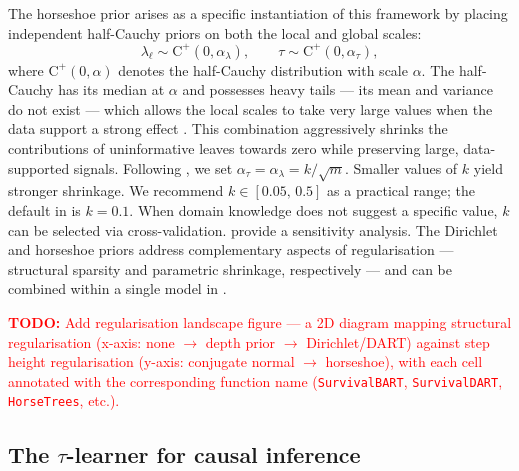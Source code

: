 The horseshoe prior \citep{carvalho2010horseshoe} arises as a specific instantiation of this framework by placing independent half-Cauchy priors on both the local and global scales:
\[
\lambda_\ell \sim \text{C}^+(0, \alpha_\lambda), \qquad
\tau \sim \text{C}^+(0, \alpha_\tau),
\]
where \(\text{C}^+(0, \alpha)\) denotes the half-Cauchy distribution with scale \(\alpha\). The half-Cauchy has its median at \(\alpha\) and possesses heavy tails --- its mean and variance do not exist --- which allows the local scales to take very large values when the data support a strong effect \citep{polson2012halfcauchy}. This combination aggressively shrinks the contributions of uninformative leaves towards zero while preserving large, data-supported signals. Following \citet{jacobs2025horseshoe}, we set \(\alpha_\tau = \alpha_\lambda = k / \sqrt{m}\). Smaller values of \(k\) yield stronger shrinkage. We recommend \(k \in [0.05,\, 0.5]\) as a practical range; the default in  is \(k = 0.1\). When domain knowledge does not suggest a specific value, \(k\) can be selected via cross-validation. \citet{jacobs2025horseshoe} provide a sensitivity analysis. The Dirichlet and horseshoe priors address complementary aspects of regularisation --- structural sparsity and parametric shrinkage, respectively --- and can be combined within a single model in .

\textcolor{red}{\textbf{TODO:} Add regularisation landscape figure — a 2D diagram mapping structural regularisation (x-axis: none $\to$ depth prior $\to$ Dirichlet/DART) against step height regularisation (y-axis: conjugate normal $\to$ horseshoe), with each cell annotated with the corresponding function name (\texttt{SurvivalBART}, \texttt{SurvivalDART}, \texttt{HorseTrees}, etc.).}

\subsection{\texorpdfstring{The \(\tau\)-learner for causal inference}{The \textbackslash tau-learner for causal inference}}\label{the-tau-learner-for-causal-inference}

